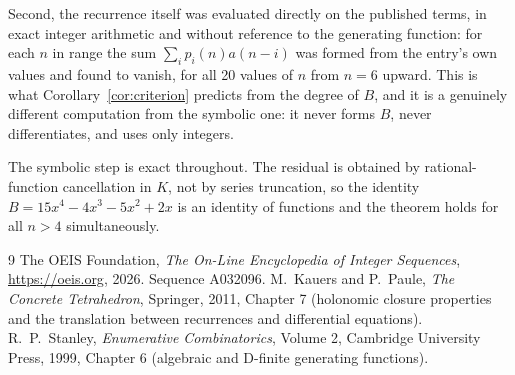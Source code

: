 \documentclass[11pt,a4paper]{article}
\theoremstyle{plain}
\theoremstyle{definition}
\begin{document}
Second, the recurrence itself was evaluated directly on the published terms, in exact
integer arithmetic and without reference to the generating function: for each $n$ in range
the sum $\sum_{i}p_{i}(n)a(n-i)$ was formed from the entry's own values and found to
vanish, for all 20 values of $n$ from $n=6$ upward. This is what
Corollary~\ref{cor:criterion} predicts from the degree of $B$, and it is a genuinely
different computation from the symbolic one: it never forms $B$, never differentiates, and
uses only integers.

The symbolic step is exact throughout. The residual is obtained by rational-function
cancellation in $K$, not by series truncation, so the identity $B=15 x^{4} - 4 x^{3} - 5 x^{2} + 2 x$ is an
identity of functions and the theorem holds for all $n>4$ simultaneously.

\begin{thebibliography}{9}
 The OEIS Foundation, \emph{The On-Line Encyclopedia of Integer Sequences},
\url{https://oeis.org}, 2026. Sequence A032096.
 M.~Kauers and P.~Paule, \emph{The Concrete Tetrahedron}, Springer, 2011,
Chapter 7 (holonomic closure properties and the translation between recurrences and
differential equations).
 R.~P.~Stanley, \emph{Enumerative Combinatorics}, Volume 2, Cambridge
University Press, 1999, Chapter 6 (algebraic and D-finite generating functions).
\end{thebibliography}
\end{document}
